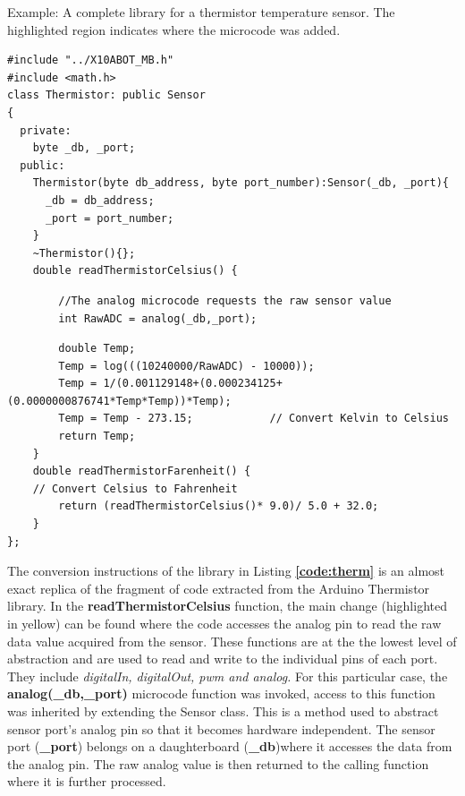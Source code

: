\begin{listing}
		\footnotesize
        {\fontsize{8}{6}\selectfont
		\caption{Example: A complete library for a thermistor temperature sensor. The highlighted region indicates where the \xten microcode was added.} \label{code:therm}
		\begin{verbatim}
#include "../X10ABOT_MB.h"
#include <math.h>
class Thermistor: public Sensor
{
  private:
    byte _db, _port;
  public:
    Thermistor(byte db_address, byte port_number):Sensor(_db, _port){
      _db = db_address;
      _port = port_number;
    }
    ~Thermistor(){};
    double readThermistorCelsius() {
    \end{verbatim}
    \begin{verbatim}
        //The analog microcode requests the raw sensor value
        int RawADC = analog(_db,_port); 
    \end{verbatim}
    \begin{verbatim}
        double Temp;
        Temp = log(((10240000/RawADC) - 10000));
        Temp = 1/(0.001129148+(0.000234125+(0.0000000876741*Temp*Temp))*Temp);
        Temp = Temp - 273.15;            // Convert Kelvin to Celsius
        return Temp;
    }
    double readThermistorFarenheit() {
    // Convert Celsius to Fahrenheit
        return (readThermistorCelsius()* 9.0)/ 5.0 + 32.0;
    }
};
	\end{verbatim}
		}
\end{listing}

The conversion instructions of the \xten library in Listing \textbf{\ref{code:therm} }is an almost exact replica of the fragment of code extracted from the Arduino Thermistor library. In the \textbf{readThermistorCelsius} function, the main change (highlighted in yellow) can be found where the code accesses the analog pin to read the raw data value acquired from the sensor. These functions are at the the lowest level of abstraction and are used to read and write to the individual pins of each port. They include \emph{digitalIn, digitalOut, pwm and analog.} For this particular case, the \textbf{analog(\_db,\_port)} microcode function was invoked, access to this function was inherited by extending the Sensor class. This is a method used to abstract sensor port's analog pin so that it becomes hardware independent. The sensor port (\textbf{\_port}) belongs on a daughterboard (\textbf{\_db})where it accesses the data from the  analog pin. The raw analog value is then returned to the calling function where it is further processed.

